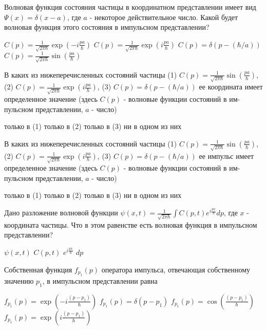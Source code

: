 \documentclass[11pt,a4paper]{exam}
\begin{document}
\begin{questions}
\question Волновая функция состояния частицы в координатном представлении имеет вид $\Psi (x) = \delta \left( {x - a} \right)$, где $a$ - некоторое действительное число. Какой будет волновая функция этого состояния в импульсном представлении?
\begin{choices}
\choice $C(p) = \frac{1}{{\sqrt {2\pi \hbar } }}\exp \left( { - i\frac{{pa}}{\hbar }} \right)$     
\choice $C(p) = \frac{1}{{\sqrt {2\pi \hbar } }}\exp \left( {i\frac{{pa}}{\hbar }} \right)$
\choice $C(p) = \delta \left( {p - (\hbar /a)} \right)$        
\choice $C(p) = \frac{1}{{\sqrt {2\pi \hbar } }}\sin \left( {\frac{{pa}}{\hbar }} \right)$
\end{choices}

\question В каких из нижеперечисленных состояний частицы
(1) $C(p) = \frac{1}{{\sqrt {2\pi \hbar } }}\sin \left( {\frac{{pa}}{\hbar }} \right)$, (2) $C(p) = \frac{1}{{\sqrt {2\pi \hbar } }}\exp \left( {i\frac{{pa}}{\hbar }} \right)$, (3) $C(p) = \delta \left( {p - (\hbar /a)} \right)$
ее координата имеет определенное значение (здесь $C(p)$ - волновые функции состояний в им-пульсном представлении, $a$ - число)
\begin{choices}
\choice только в (1) 
\choice только в (2) 
\choice только в (3) 
\choice ни в одном из них
\end{choices}

\question В каких из нижеперечисленных состояний частицы
(1) $C(p) = \frac{1}{{\sqrt {2\pi \hbar } }}\sin \left( {\frac{{pa}}{\hbar }} \right)$, (2) $C(p) = \frac{1}{{\sqrt {2\pi \hbar } }}\exp \left( {i\frac{{pa}}{\hbar }} \right)$, (3) $C(p) = \delta \left( {p - (\hbar /a)} \right)$
ее импульс имеет определенное значение (здесь $C(p)$ - волновые функции состояний в им-пульсном представлении, $a$ - число)
\begin{choices}
\choice только в (1) 
\choice только в (2) 
\choice только в (3) 
\choice ни в одном из них
\end{choices}

\question Дано разложение волновой функции $\psi (x,t) = \frac{1}{{\sqrt {2\pi \hbar } }}\int {C(p,t){e^{i\frac{{px}}{\hbar }}}dp} $, где $x$ - координата частицы. Что в этом равенстве есть волновая функция в импульсном представлении?
\begin{choices}
\choice $\psi (x,t)$    
\choice $C(p,t)$     
\choice ${e^{i\frac{{px}}{\hbar }}}$         
\choice $dp$
\end{choices}

\question Собственная функция ${f_{{p_1}}}(p)$ оператора импульса, отвечающая собственному значению ${p_1}$, в импульсном представлении равна
\begin{choices}
\choice ${f_{{p_1}}}(p) = \exp \left( { - i\frac{{(p - {p_1})}}{\hbar }} \right)$         
\choice ${f_{{p_1}}}(p) = \delta \left( {p - {p_1}} \right)$
\choice ${f_{{p_1}}}(p) = \cos \left( {\frac{{(p - {p_1})}}{\hbar }} \right)$       
\choice ${f_{{p_1}}}(p) = \exp \left( {i\frac{{(p - {p_1})}}{\hbar }} \right)$
\end{choices}


\end{questions}
\end{document}
